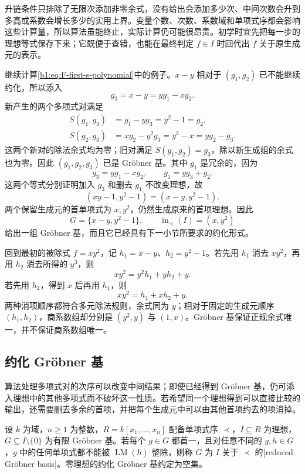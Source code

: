 升链条件只排除了无限次添加非零余式，没有给出会添加多少次、中间次数会升到多高或系数会增长多少的实用上界。变量个数、次数、系数域和单项式序都会影响这些计算量，所以算法虽能终止，实际计算仍可能很昂贵。初学时宜先把每一步的理想等式保存下来；它既便于查错，也能在最终判定 \(f\in I\) 时回代出 \(f\) 关于原生成元的表示。

\ProseParagraphBreak
继续计算\eqref{b1:eq:F-first-s-polynomial}中的例子。\(x-y\) 相对于 \((g_1,g_2)\) 已不能继续约化，所以添入
\[
	g_3=x-y=yg_1-xg_2.
\]
新产生的两个多项式对满足
\begin{align*}
	S(g_1,g_3)&=g_1-yg_3=y^2-1=g_2,\\
	S(g_2,g_3)&=xg_2-y^2g_3=y^3-x=yg_2-g_3.
\end{align*}
这两个新对的除法余式均为零；旧对满足 \(S(g_1,g_2)=g_3\)，除以新生成组的余式也为零。因此 \((g_1,g_2,g_3)\) 已是 Gröbner 基。其中 \(g_1\) 是冗余的，因为
\begin{equation}\label{b1:eq:F-example-ideal-certificates}
	g_3=yg_1-xg_2,\qquad g_1=yg_3+g_2.
\end{equation}
这两个等式分别证明加入 \(g_3\) 和删去 \(g_1\) 不改变理想，故
\[
	(xy-1,y^2-1)=(x-y,y^2-1).
\]
两个保留生成元的首单项式为 \(x,y^2\)，仍然生成原来的首项理想。因此
\begin{equation}\label{b1:eq:F-main-reduced-basis}
	G=\{x-y,y^2-1\},\qquad \operatorname{in}_\prec(I)=(x,y^2)
\end{equation}
给出一组 Gröbner 基，而且它已经具有下一小节所要求的约化形式。

回到最初的被除式 \(f=xy^2\)，记 \(h_1=x-y\)、\(h_2=y^2-1\)。若先用 \(h_1\) 消去 \(xy^2\)，再用 \(h_2\) 消去所得的 \(y^3\)，则
\[
	xy^2=y^2h_1+yh_2+y.
\]
若先用 \(h_2\)，得到 \(x\) 后再用 \(h_1\)，则
\[
	xy^2=h_1+xh_2+y.
\]
两种消项顺序都符合多元除法规则，余式同为 \(y\)；相对于固定的生成元顺序 \((h_1,h_2)\)，商系数组却分别是 \((y^2,y)\) 与 \((1,x)\)。Gröbner 基保证正规余式唯一，并不保证商系数组唯一。

\subsection{约化 Gröbner 基}
\label{b1:subsec:F03:03}

算法处理多项式对的次序可以改变中间结果；即使已经得到 Gröbner 基，仍可添入理想中的其他多项式而不破坏这一性质。若希望同一个理想得到可以直接比较的输出，还需要删去多余的首项，并把每个生成元中可以由其他首项约去的项消掉。

\begin{definition}\label{b1:def:F-reduced-groebner}
	设 \(k\) 为域，\(n\geq1\) 为整数，\(R=k[x_1,\ldots,x_n]\) 配备单项式序 \(\prec\)，\(I\subseteq R\) 为理想，\(G\subseteq I\setminus\{0\}\) 为有限 Gröbner 基。若每个 \(g\in G\) 都首一，且对任意不同的 \(g,h\in G\)，\(g\) 中的任何单项式都不能被 \(\operatorname{LM}(h)\) 整除，则称 \(G\) 为 \(I\) 关于 \(\prec\) 的[reduced Gröbner basis]。零理想的约化 Gröbner 基约定为空集。
\end{definition}

